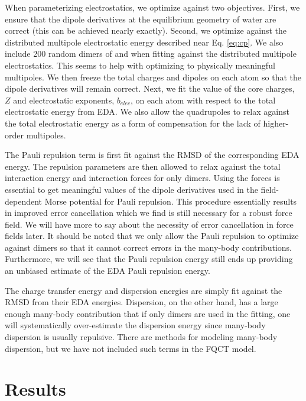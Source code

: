 \documentclass[journal=jctcce,manuscript=article]{achemso}
\begin{document}
When parameterizing electrostatics, we optimize against two objectives. First, we ensure that the dipole derivatives at the equilibrium geometry of water are correct (this can be achieved nearly exactly). Second, we optimize against the distributed multipole electrostatic energy described near Eq. \ref{eq:cp}. We also include 200 random dimers of  and  when fitting against the distributed multipole electrostatics. This seems to help with optimizing to physically meaningful multipoles. We then freeze the total charges and dipoles on each atom so that the dipole derivatives will remain correct. Next, we fit the value of the core charges, $Z$ and electrostatic exponents, $b_{elec}$, on each atom with respect to the total electrostatic energy from EDA. We also allow the quadrupoles to relax against the total electrostatic energy as a form of compensation for the lack of higher-order multipoles.

The Pauli repulsion term is first fit against the RMSD of the corresponding EDA energy. The repulsion parameters are then allowed to relax against the total interaction energy and interaction forces for only dimers. Using the forces is essential to get meaningful values of the dipole derivatives used in the field-dependent Morse potential for Pauli repulsion. This procedure essentially results in improved error cancellation which we find is still necessary for a robust force field. We will have more to say about the necessity of error cancellation in force fields later. It should be noted that we only allow the Pauli repulsion to optimize against dimers so that it cannot correct errors in the many-body contributions. Furthermore, we will see that the Pauli repulsion energy still ends up providing an unbiased estimate of the EDA Pauli repulsion energy.

The charge transfer energy and dispersion energies are simply fit against the RMSD from their EDA energies. Dispersion, on the other hand, has a large enough many-body contribution that if only dimers are used in the fitting, one will systematically over-estimate the dispersion energy since many-body dispersion is usually repulsive. There are methods for modeling many-body dispersion, but we have not included such terms in the FQCT model.\cite{anatole2010two,van2018new} 

\section*{Results}
\end{document}
